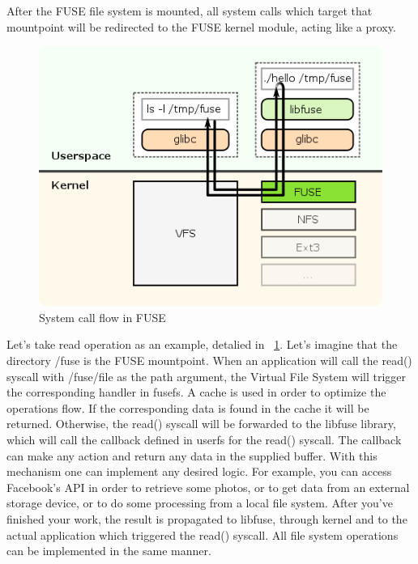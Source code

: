         After the FUSE file system is mounted, all system calls which target that mountpoint will be redirected to the FUSE kernel module, acting like a proxy.
        
        \begin{figure}[h]
           \begin{center}
               \includegraphics[width=15cm]{theoretical/fuse.png}
            \end{center}
            \caption{System call flow in FUSE \cite{FuseArch}}
            \label{fig:fuse}
        \end{figure}
         
        Let's take read operation as an example, detalied in ~\ref{fig:fuse}. Let's imagine that the directory /fuse is the FUSE mountpoint. When an application will call the read() syscall with /fuse/file as the path argument, the Virtual File System will trigger the corresponding handler in fusefs. A cache is used in order to optimize the operations flow. If the corresponding data is found in the cache it will be returned. Otherwise, the read() syscall will be forwarded to the libfuse library, which will call the callback defined in userfs for the read() syscall. The callback can make any action and return any data in the supplied buffer. With this mechanism one can implement any desired logic. For example, you can access Facebook's API in order to retrieve some photos, or to get data from an external storage device, or to do some processing from a local file system. After you've finished your work, the result is propagated to libfuse, through kernel and to the actual application which triggered the read() syscall. All file system operations can be implemented in the same manner.
        

